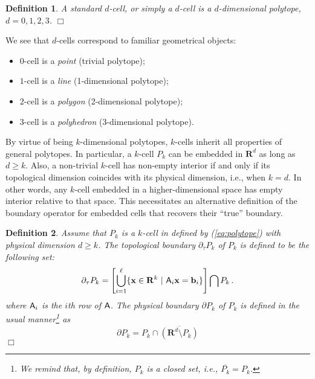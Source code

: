 \documentclass[pdf,12pt,relaxed]{SANDreport}
\newtheorem{defin}{Definition}
\begin{document}
    \begin{defin}\label{def:cell}
    A standard $d$-cell, or simply a $d$-cell is a  $d$-dimensional polytope, $d=0,1,2,3$. \hfill$\Box$
    \end{defin}
    
    We see that $d$-cells correspond to familiar geometrical objects:
    \begin{itemize}
    \item $0$-cell is a \emph{point} (trivial polytope);
    \item $1$-cell is a \emph{line} (1-dimensional polytope);
    \item $2$-cell is  a \emph{polygon} (2-dimensional polytope);
    \item $3$-cell is a \emph{polyhedron} (3-dimensional polytope).
    \end{itemize}

     By virtue of being $k$-dimensional polytopes, $k$-cells inherit all properties of general polytopes. In particular, 
    a $k$-cell $P_k$ can be embedded in $\mathbf{R}^d$ as long as $d\ge k$. Also, a non-trivial $k$-cell has non-empty interior if and only if its topological dimension coincides with its physical dimension, i.e., when $k=d$. In other words, any $k$-cell embedded in a higher-dimensional space has empty interior relative to that space. This necessitates an alternative definition of the boundary operator for embedded cells that recovers their ``true'' boundary.
    
    
        
    
    \begin{defin}\label{def:bdry}
    Assume that $P_k$ is a $k$-cell in defined by (\ref{eq:polytope}) with physical dimension $d\ge k$. 
    The topological boundary $\partial_\tau {P_k}$ of $P_k$ is defined to be the following set:
    \begin{equation}\label{eq:bdry}
    \partial_\tau{P_k} = 
    \left[ \bigcup_{i=1}^{\ell}
    \{ {\bf x}\in{\mathbf R}^k\,\,|\,\, {\sf A}_i {\bf x} = {\bf b}_i \} \right]\bigcap {P_k} \,.
    \end{equation}
    where ${\sf A}_i$ is the $i$th row of ${\sf A}$.
    The physical boundary $\partial {P_k}$ of $P_k$ is defined in the usual manner\footnote{We remind that, by definition, $P_k$ is a closed set, i.e., $\overline{P_k} = P_k$.} as
    \begin{equation}\label{eq:phys-bdry}
    \partial{P_k} = P_k \cap\overline{(\mathbf{R}^d\setminus P_k)}
    \end{equation}
    \hfill$\Box$
    \end{defin}
    
\end{document}
